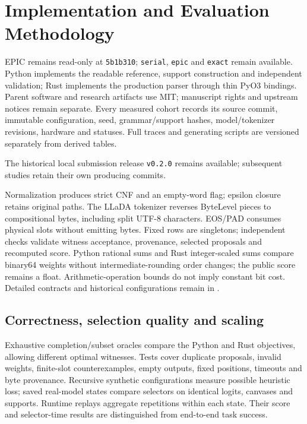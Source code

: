 \section{Implementation and Evaluation Methodology}
\label{sec:metodologia}

EPIC remains read-only at \texttt{5b1b310}; \texttt{serial}, \texttt{epic} and \texttt{exact} remain available. Python implements the readable reference, support construction and independent validation; Rust implements the production parser through thin PyO3 bindings. Parent software and research artifacts use MIT; manuscript rights and upstream notices remain separate. Every measured cohort records its source commit, immutable configuration, seed, grammar/support hashes, model/tokenizer revisions, hardware and statuses. Full traces and generating scripts are versioned separately from derived tables.

The historical local submission release \texttt{v0.2.0} remains available; subsequent studies retain their own producing commits.

Normalization produces strict CNF and an empty-word flag; epsilon closure retains original paths. The LLaDA tokenizer reverses ByteLevel pieces to compositional bytes, including split UTF-8 characters. EOS/PAD consumes physical slots without emitting bytes. Fixed rows are singletons; independent checks validate witness acceptance, provenance, selected proposals and recomputed score. Python rational sums and Rust integer-scaled sums compare binary64 weights without intermediate-rounding order changes; the public score remains a float. Arithmetic-operation bounds do not imply constant bit cost. Detailed contracts and historical configurations remain in .

\subsection{Correctness, selection quality and scaling}

Exhaustive completion/subset oracles compare the Python and Rust objectives, allowing different optimal witnesses. Tests cover duplicate proposals, invalid weights, finite-slot counterexamples, empty outputs, fixed positions, timeouts and byte provenance. Recursive synthetic configurations measure possible heuristic loss; saved real-model states compare selectors on identical logits, canvases and supports. Runtime replays aggregate repetitions within each state. Their score and selector-time results are distinguished from end-to-end task success.

